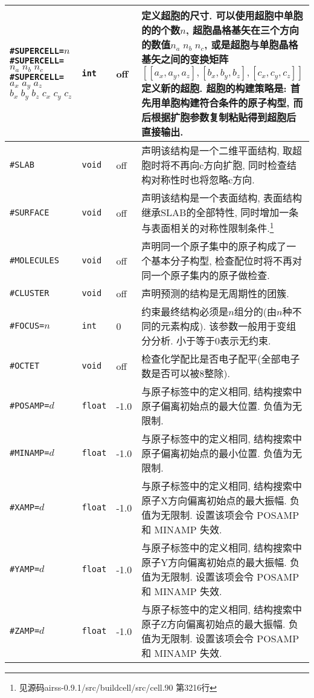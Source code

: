 \documentclass[a4paper, 10pt]{article}
\begin{document}
\begin{center}
\begin{longtable}{m{11em}|m{4em}<{\centering}|m{3em}<{\centering}|m{15em}}
\midrule
\verb|#SUPERCELL=|\(n\) \verb|#SUPERCELL=|\(n_a\;n_b\;n_c\;\;\;\;\;\;\) \hspace{2em}\verb|#SUPERCELL=|\(a_x\; a_y\;a_z\;\)\hspace{2em} \(b_x\;b_y\;b_z\;c_x\;c_y\;c_z\) & \verb|int| & off & 定义超胞的尺寸. 可以使用超胞中单胞的的个数\(n\), 超胞晶格基矢在三个方向的数值\(n_a\;n_b\;n_c\), 或是超胞与单胞晶格基矢之间的变换矩阵\([[a_x,a_y,a_z],[b_x,b_y,b_z],[c_x,c_y,c_z]]\)定义新的超胞. 超胞的构建策略是: 首先用单胞构建符合条件的原子构型, 而后根据扩胞参数复制粘贴得到超胞后直接输出.\\
\midrule
\verb|#SLAB| & \verb|void| & off & 声明该结构是一个二维平面结构, 取超胞时将不再向c方向扩胞, 同时检查结构对称性时也将忽略c方向.\\
\midrule
\verb|#SURFACE| & \verb|void| & off & 声明该结构是一个表面结构, 表面结构继承SLAB的全部特性, 同时增加一条与表面相关的对称性限制条件.\footnote{见源码airss-0.9.1/src/buildcell/src/cell.90 第3216行}\\
\midrule
\verb|#MOLECULES|& \verb|void| & off & 声明同一个原子集中的原子构成了一个基本分子构型, 检查配位时将不再对同一个原子集内的原子做检查.\\
\midrule
\verb|#CLUSTER| & \verb|void| & off & 声明预测的结构是无周期性的团簇.\\
\midrule
\verb|#FOCUS=|\(n\) & \verb|int| & 0 & 约束最终结构必须是\(n\)组分的(由\(n\)种不同的元素构成). 该参数一般用于变组分分析. 小于等于0表示无约束.\\
\midrule
\verb|#OCTET|& \verb|void| & off & 检查化学配比是否电子配平(全部电子数是否可以被8整除).\\
\midrule
\verb|#POSAMP=|\(d\) & \verb|float|  & -1.0 & 与原子标签中的定义相同, 结构搜索中原子偏离初始点的最大位置. 负值为无限制.\\
\midrule
\verb|#MINAMP=|\(d\) & \verb|float| & -1.0 & 与原子标签中的定义相同, 结构搜索中原子偏离初始点的最小位置. 负值为无限制.\\
\midrule
\verb|#XAMP=|\(d\) & \verb|float| & -1.0 & 与原子标签中的定义相同, 结构搜索中原子X方向偏离初始点的最大振幅. 负值为无限制. 设置该项会令 POSAMP 和 MINAMP 失效. \\
\midrule
\verb|#YAMP=|\(d\) & \verb|float| & -1.0 & 与原子标签中的定义相同, 结构搜索中原子Y方向偏离初始点的最大振幅. 负值为无限制. 设置该项会令 POSAMP 和 MINAMP 失效.\\
\midrule
\verb|#ZAMP=|\(d\) & \verb|float| & -1.0 & 与原子标签中的定义相同, 结构搜索中原子Z方向偏离初始点的最大振幅. 负值为无限制. 设置该项会令 POSAMP 和 MINAMP 失效.\\

\end{longtable}
\end{center}
\end{document}
